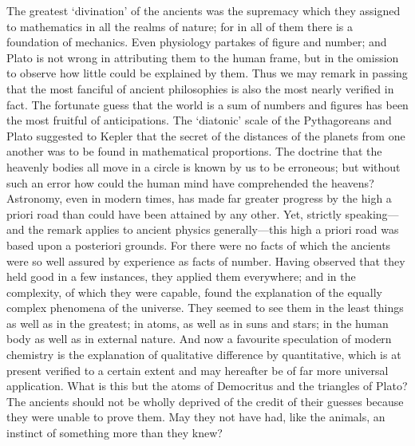\documentclass[11pt,letter]{article}
\begin{document}
\par  The greatest ‘divination’ of the ancients was the supremacy which they assigned to mathematics in all the realms of nature; for in all of them there is a foundation of mechanics. Even physiology partakes of figure and number; and Plato is not wrong in attributing them to the human frame, but in the omission to observe how little could be explained by them. Thus we may remark in passing that the most fanciful of ancient philosophies is also the most nearly verified in fact. The fortunate guess that the world is a sum of numbers and figures has been the most fruitful of anticipations. The ‘diatonic’ scale of the Pythagoreans and Plato suggested to Kepler that the secret of the distances of the planets from one another was to be found in mathematical proportions. The doctrine that the heavenly bodies all move in a circle is known by us to be erroneous; but without such an error how could the human mind have comprehended the heavens? Astronomy, even in modern times, has made far greater progress by the high a priori road than could have been attained by any other. Yet, strictly speaking—and the remark applies to ancient physics generally—this high a priori road was based upon a posteriori grounds. For there were no facts of which the ancients were so well assured by experience as facts of number. Having observed that they held good in a few instances, they applied them everywhere; and in the complexity, of which they were capable, found the explanation of the equally complex phenomena of the universe. They seemed to see them in the least things as well as in the greatest; in atoms, as well as in suns and stars; in the human body as well as in external nature. And now a favourite speculation of modern chemistry is the explanation of qualitative difference by quantitative, which is at present verified to a certain extent and may hereafter be of far more universal application. What is this but the atoms of Democritus and the triangles of Plato? The ancients should not be wholly deprived of the credit of their guesses because they were unable to prove them. May they not have had, like the animals, an instinct of something more than they knew?
\end{document}
